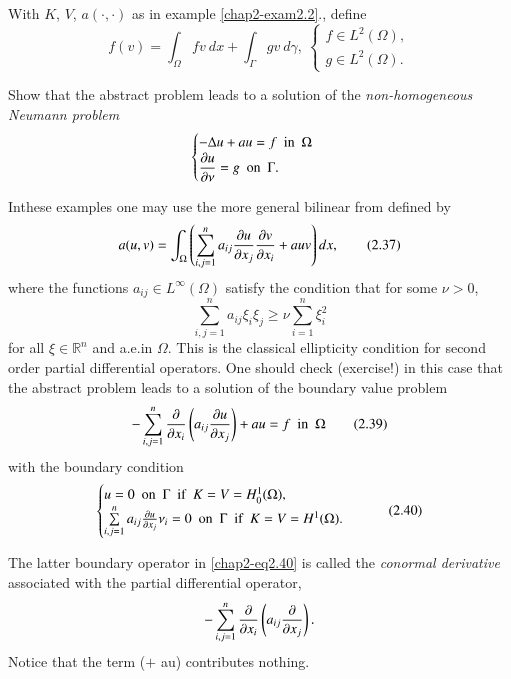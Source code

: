 \begin{exercise}\label{chap2-exer2.3}
With $K$, $V$, $a(\cdot,\cdot)$ as in example \ref{chap2-exam2.2}.,
define
$$
f(v)=\int_{\Omega}fv\ dx+\int_{\Gamma}gv\ d\gamma,\ 
\begin{cases}
f\in L^{2}(\Omega),\\
g\in L^{2}(\Omega).
\end{cases}
$$

Show that the abstract problem leads to a solution of the {\em
  non-homo\-geneous Neumann problem}
$$
\begin{cases}
-\Delta u +au =f\text{~ in~ }\Omega\\
\dfrac{\partial u}{\partial \nu}=g\text{~ on~ }\Gamma.
\end{cases}
$$
\end{exercise}

\begin{remark}\label{chap2-rem2.2}
In\pageoriginale these examples one may use the more general bilinear
from defined by
\begin{equation*}
a(u,v)=\int_{\Omega}\left(\sum^{n}_{i,j=1}a_{ij}\frac{\partial u}{\partial
  x_{j}}\frac{\partial v}{\partial
  x_{i}}+auv\right)dx,\tag{2.37}\label{chap2-eq2.37} 
\end{equation*}
where the functions $a_{ij}\in L^{\infty}(\Omega)$ satisfy the
condition that for some $\nu>0$,
\begin{equation*}
\sum^{n}_{i,j=1}a_{ij}\xi_{i}\xi_{j}\geq
\nu\sum^{n}_{i=1}\xi^{2}_{i}\tag{2.38}\label{chap2-eq2.38} 
\end{equation*}
for all $\xi\in\mathbb{R}^{n}$ and a.e.\@ in $\Omega$. This is the
classical ellipticity condition for second order partial differential
operators. One should check (exercise!) in this case that the abstract
problem leads to a solution of the boundary value problem
\begin{equation*}
-\sum^{n}_{i,j=1}\frac{\partial}{\partial x_{i}}\left(a_{ij}\frac{\partial u}{\partial
  x_{j}}\right)+au=f\text{~ in~ }\Omega\tag{2.39}\label{chap2-eq2.39}
\end{equation*}
with the boundary condition
\begin{equation*}
\begin{cases}
u=0\text{~ on~ }\Gamma \text{~ if~ } K=V=H^{1}_{0}(\Omega),\\
\sum\limits^{n}_{i,j=1}a_{ij}\frac{\partial u}{\partial x_{j}}\nu_{i}=0\text{~ on~
}\Gamma\text{~ if~ }K=V=H^{1}(\Omega). 
\end{cases}\tag{2.40}\label{chap2-eq2.40}
\end{equation*}

The latter boundary operator in \eqref{chap2-eq2.40} is called the
{\em conormal derivative} associated with the partial differential
  operator, 
$$
-\sum^{n}_{i,j=1}\frac{\partial}{\partial
    x_{i}}\left(a_{ij}\dfrac{\partial}{\partial x_{j}}\right).
$$
 Notice that the  term ($+$ au) contributes nothing.
\end{remark}

